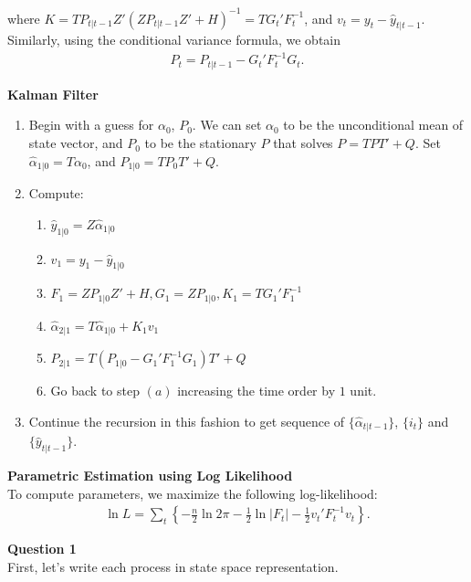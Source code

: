 \documentclass{article}
\begin{document}
	where $K = TP_{t|t-1}Z'(ZP_{t|t-1}Z' + H)^{-1} = T G_t' F_t^{-1}$, and $v_t = y_t - \hat{y}_{t|t-1}$. Similarly, using the conditional variance formula, we obtain
	\begin{align*}
		P_t = P_{t|t-1} - G_t'F_t^{-1}G_t.
	\end{align*}
	
	\noindent\textbf{\Large Kalman Filter} \\
	
	\begin{enumerate}
		\item Begin with a guess for $\alpha_0$, $P_0$.  We can set $\alpha_0$ to be the unconditional mean of state vector, and $P_0$ to be the stationary $P$ that solves $P = TPT' + Q$. Set $\hat{\alpha}_{1|0} = T \alpha_0$, and  $P_{1|0} = TP_{0}T' + Q$.
		\item Compute:
		\begin{enumerate}
			\item $\hat{y}_{1|0} = Z\hat{\alpha}_{1|0}$
			\item $v_1 = y_1 - \hat{y}_{1|0} $
			\item $F_1 = ZP_{1|0}Z' + H, G_1 = ZP_{1|0}, K_1 = TG_1'F_1^{-1}$
			\item $\hat{\alpha}_{2|1} = T \hat{\alpha}_{1|0} + K_1 v_1$
			\item $P_{2|1} = T(P_{1|0} - G_1'F_1^{-1}G_1)T' + Q$
			\item Go back to step $(a)$ increasing the time order by $1$ unit.
		\end{enumerate}
		\item Continue the recursion in this fashion to get sequence of $\{ \hat{\alpha}_{t|t-1} \}$, $\{i_t\}$ and $\{\hat{y}_{t|t-1}\}.$
	\end{enumerate}

	\noindent\textbf{\Large Parametric Estimation using Log Likelihood} \\
	
	To compute parameters, we maximize the following log-likelihood:
	\begin{align*}
		\ln L = \sum_t \left\{ -\frac{n}{2} \ln 2\pi -\frac{1}{2}\ln |F_t| - \frac{1}{2}v_t'F_t^{-1}v_t \right\}. 
	\end{align*}
	
	\noindent\textbf{\Large Question 1} \\
	
	First, let's write each process in state space representation.
	
\end{document}
